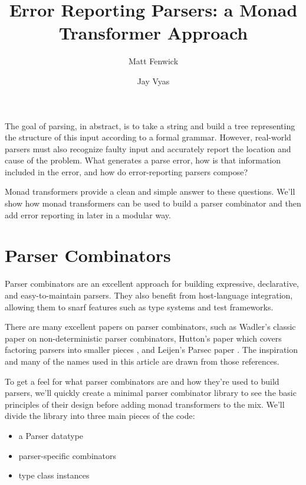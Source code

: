 \documentclass{tmr}
\title{Error Reporting Parsers:  a Monad Transformer Approach}
\author{Matt Fenwick\email{mfenwick100@gmail.com}}
\author{Jay Vyas\email{jayunit100@gmail.com}}
\begin{document}
\begin{introduction}

The goal of parsing, in abstract, is to take a string and build a tree
representing the structure of this input according to a formal grammar.
However, real-world parsers must also recognize faulty input and
accurately report the location and cause of the problem.  What generates
a parse error, how is that information included in the error, and how do
error-reporting parsers compose?

Monad transformers provide a clean and simple answer to these questions.
We'll show how monad transformers can be used to build a parser combinator
and then add error reporting in later in a modular way.

\end{introduction}




\section{Parser Combinators}


Parser combinators are an excellent approach for building expressive, 
declarative, and easy-to-maintain parsers.  They also benefit from host-language
integration, allowing them to snarf features such as type systems and test 
frameworks. 

There are many excellent papers on parser combinators, such
as Wadler's classic paper \cite{wadler} on non-deterministic parser combinators, 
Hutton's paper which covers factoring parsers into smaller pieces \cite{hutton}, 
and Leijen's Parsec paper \cite{leijen}.
The inspiration and many of the names used in this article are drawn 
from those references.

To get a feel for what parser combinators are and how they're used to
build parsers, we'll quickly create a minimal parser combinator library to see
the basic principles of their design before adding monad transformers to
the mix.  We'll divide the library into three main pieces of the code:

\begin{itemize}
 \item a Parser datatype
 \item parser-specific combinators
 \item type class instances
\end{itemize}
\end{document}
